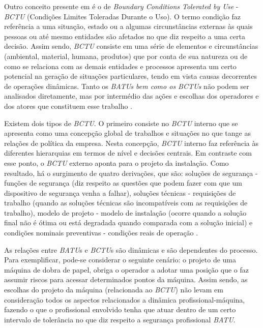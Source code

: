 Outro conceito presente em \cite{safety} é o de \textit{Boundary Conditions Tolerated by Use} - \textit{BCTU} (Condições Limites Toleradas Durante o Uso). O termo condição faz referência a uma situação, estado ou a algumas circunstâncias externas às quais pessoas ou até mesmo entidades são afetados no que diz respeito a uma certa decisão. Assim sendo, \textit{BCTU} consiste em uma série de elementos e circunstâncias (ambiental, material, humana, produtos) que por conta de sua natureza ou de como se relaciona com as demais entidades e processos apresenta um certo potencial na geração de situações particulares, tendo em vista causas decorrentes de operações dinâmicas. Tanto os \textit{BATUs bem como os BCTUs} não podem ser analisados diretamente, mas por intermédio das ações e escolhas dos operadores e dos atores que constituem esse trabalho \cite{safety}. 

Existem dois tipos de \textit{BCTU}. O primeiro consiste no \textit{BCTU} interno que se apresenta como uma concepção global de trabalhos e situações no que tange as relações de política da empresa. Nesta concepção, \textit{BCTU} interno faz referência às diferentes hierarquias em termos de nível e decisões centrais. Em contraste com esse ponto, o \textit{BCTU} externo aponta para o projeto da instalação. Como resultado, há o surgimento de quatro derivações, que são: soluções de segurança - funções de segurança (diz respeito as questões que podem fazer com que um dispositivo de segurança venha a falhar), soluções técnicas - requisições de trabalho (quando as soluções técnicas são incompatíveis com as requisições de trabalho), modelo de projeto - modelo de instalação (ocorre quando a solução final não é ótima ou está degradada quando comparada com a solução inicial) e condições nominais preventivas - condições reais de operação
\cite{safety}.

As relações entre \textit{BATU}s e \textit{BCTU}s são dinâmicas e são dependentes do processo. Para exemplificar, pode-se considerar o seguinte cenário: o projeto de uma máquina de dobra de papel, obriga o operador a adotar uma posição que o faz assumir riscos para acessar determinados pontos da máquina.  Assim sendo, as escolhas do projeto da máquina (relacionada ao \textit{BCTU}) não levam em consideração todos os aspectos relacionados a dinâmica profissional-máquina, fazendo o que o profissional envolvido tenha que atuar dentro de um certo intervalo de tolerância no que diz respeito a segurança profissional \textit{BATU}.
